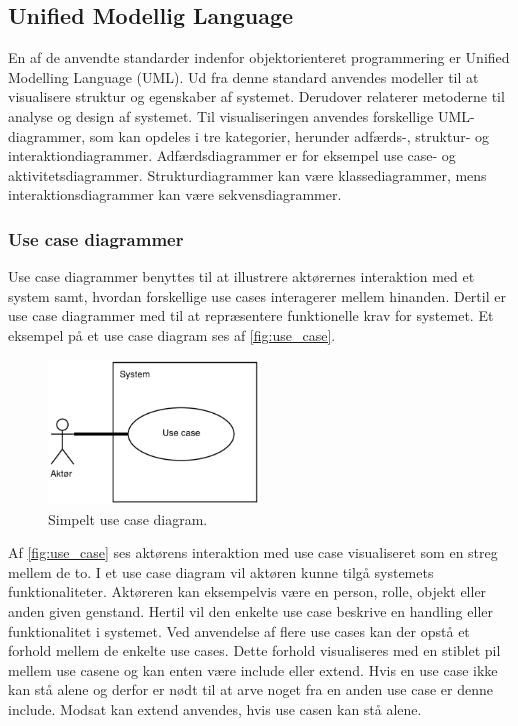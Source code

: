 \subsection{Unified Modellig Language}
En af de anvendte standarder indenfor objektorienteret programmering er Unified Modelling Language (UML). Ud fra denne standard anvendes modeller til at visualisere struktur og egenskaber af systemet. Derudover relaterer metoderne til analyse og design af systemet. Til visualiseringen anvendes forskellige UML-diagrammer, som kan opdeles i tre kategorier, herunder adfærds-, struktur- og interaktiondiagrammer. Adfærdsdiagrammer er for eksempel use case- og  aktivitetsdiagrammer. Strukturdiagrammer kan være klassediagrammer, mens interaktionsdiagrammer kan være sekvensdiagrammer.\cite{Fowler2004, Williams2004}


\subsubsection{Use case diagrammer} 
Use case diagrammer benyttes til at illustrere aktørernes interaktion med et system samt, hvordan forskellige use cases interagerer mellem hinanden. Dertil er use case diagrammer med til at repræsentere funktionelle krav for systemet.\cite{Williams2004} Et eksempel på et use case diagram ses af \autoref{fig:use_case}.

\begin{figure} [H]
\centering
\includegraphics[width=0.5\textwidth]{figures/USE_CASE2}
\caption{Simpelt use case diagram.}
\label{fig:use_case}
\end{figure}

\noindent
Af \autoref{fig:use_case} ses aktørens interaktion med use case visualiseret som en streg mellem de to. I et use case diagram vil aktøren kunne tilgå systemets funktionaliteter. Aktøreren kan eksempelvis være en person, rolle, objekt eller anden given genstand. Hertil vil den enkelte use case beskrive en handling eller funktionalitet i systemet. Ved anvendelse af flere use cases kan der opstå et forhold mellem de enkelte use cases. Dette forhold visualiseres med en stiblet pil mellem use casene og kan enten være include eller extend. Hvis en use case ikke kan stå alene og derfor er nødt til at arve noget fra en anden use case er denne include. Modsat kan extend anvendes, hvis use casen kan stå alene.\cite{Fowler2004, Williams2004}


